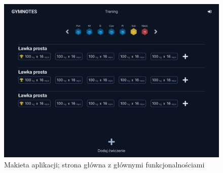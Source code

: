 \documentclass{article}
\begin{document}
            \begin{figure}[ht]
                  \centering
                  \includegraphics[height=8cm]{Trening.png}
                  \caption{Makieta aplikacji; strona główna z głównymi funkcjonalnościami}
            \end{figure}

      
      
\end{document}
